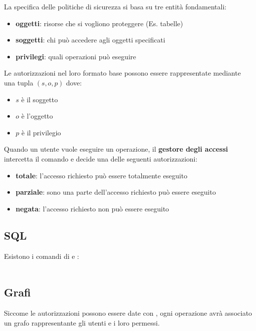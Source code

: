 La specifica delle politiche di sicurezza si basa su tre entità fondamentali:
\begin{itemize}
    \item \textbf{oggetti}: risorse che si vogliono proteggere (Es. tabelle)
    \item \textbf{soggetti}: chi può accedere agli oggetti specificati
    \item \textbf{privilegi}: quali operazioni può eseguire
\end{itemize}
Le autorizzazioni nel loro formato base possono essere rappresentate mediante una tupla $(s,o,p)$ dove:
\begin{itemize}
    \item $s$ \`e il soggetto
    \item $o$ \`e l'oggetto
    \item $p$ \`e il privilegio
\end{itemize}
Quando un utente vuole eseguire un operazione, il \textbf{gestore degli accessi} intercetta il comando e decide una delle seguenti autorizzazioni:
\begin{itemize}
    \item \textbf{totale}: l'accesso richiesto può essere totalmente eseguito
    \item \textbf{parziale}: sono una parte dell'accesso richiesto può essere eseguito
    \item \textbf{negata}: l'accesso richiesto non può essere eseguito
\end{itemize}

\subsection{SQL}
Esistono i comandi di  e :\vspace{2mm} \\
\vspace{2mm} \\

\break
\subsection{Grafi}
Siccome le autorizzazioni possono essere date con , ogni operazione avrà associato un grafo rappresentante gli utenti e i loro permessi.

